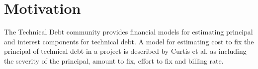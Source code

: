 \section{Motivation}
The Technical Debt community provides financial models for estimating principal and interest components for technical debt.  A model for estimating cost to fix the principal of technical debt in a project is described by Curtis et al. \cite{Curtis2012Estimating} as including the severity of the principal, amount to fix, effort to fix and billing rate.